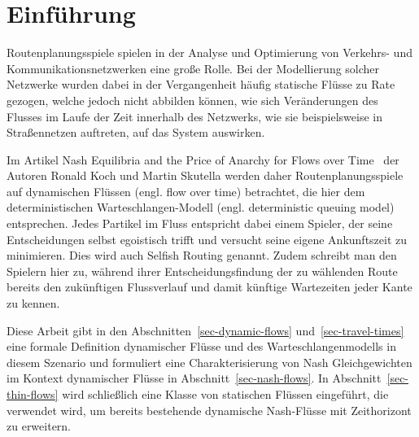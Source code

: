 \section{Einführung}\label{introduction}

Routenplanungsspiele spielen in der Analyse und Optimierung von Verkehrs- und Kommunikationsnetzwerken eine große Rolle.
Bei der Modellierung solcher Netzwerke wurden dabei in der Vergangenheit häufig statische Flüsse zu Rate gezogen, welche jedoch nicht abbilden können, wie sich Veränderungen des Flusses im Laufe der Zeit innerhalb des Netzwerks, wie sie beispielsweise in Straßennetzen auftreten, auf das System auswirken.

Im Artikel \glqq Nash Equilibria and the Price of Anarchy for Flows over Time\grqq\ \cite{Koch2011} der Autoren Ronald Koch und Martin Skutella werden daher Routenplanungsspiele auf dynamischen Flüssen (engl. flow over time) betrachtet, die hier dem deterministischen Warte\-schlangen-Modell (engl. deterministic queuing model) entsprechen.
Jedes Partikel im Fluss entspricht dabei einem Spieler, der seine Entscheidungen selbst egoistisch trifft und versucht seine eigene Ankunftszeit zu minimieren.
Dies wird auch Selfish Routing genannt.
Zudem schreibt man den Spielern hier zu, während ihrer Entscheidungsfindung der zu wählenden Route bereits den zukünftigen Flussverlauf und damit künftige Wartezeiten jeder Kante zu kennen.

Diese Arbeit gibt in den Abschnitten~\ref{sec-dynamic-flows} und~\ref{sec-travel-times} eine formale Definition dynamischer Flüsse und des Warteschlangenmodells in diesem Szenario und formuliert eine Charakterisierung von Nash Gleichgewichten im Kontext dynamischer Flüsse in Abschnitt~\ref{sec-nash-flows}.
In Abschnitt~\ref{sec-thin-flows} wird schließlich eine Klasse von statischen Flüssen eingeführt, die verwendet wird, um bereits bestehende dynamische Nash-Flüsse mit Zeithorizont zu erweitern.